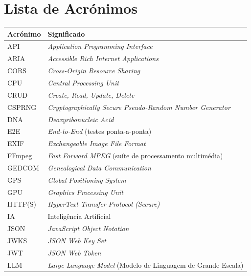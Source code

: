 \chapter*{Lista de Acrónimos}

\begin{longtable}{@{}p{2.6cm}p{12cm}@{}}
\textbf{Acrónimo} & \textbf{Significado} \\
\midrule
\endhead
API    & \textit{Application Programming Interface} \\
ARIA   & \textit{Accessible Rich Internet Applications} \\
CORS   & \textit{Cross-Origin Resource Sharing} \\
CPU    & \textit{Central Processing Unit} \\
CRUD   & \textit{Create, Read, Update, Delete} \\
CSPRNG & \textit{Cryptographically Secure Pseudo-Random Number Generator} \\
DNA    & \textit{Deoxyribonucleic Acid} \\
E2E    & \textit{End-to-End} (testes ponta-a-ponta) \\
EXIF   & \textit{Exchangeable Image File Format} \\
FFmpeg & \textit{Fast Forward MPEG} (suíte de processamento multimédia) \\
GEDCOM & \textit{Genealogical Data Communication} \\
GPS    & \textit{Global Positioning System} \\
GPU    & \textit{Graphics Processing Unit} \\
HTTP(S)& \textit{HyperText Transfer Protocol (Secure)} \\
IA     & Inteligência Artificial \\
JSON   & \textit{JavaScript Object Notation} \\
JWKS   & \textit{JSON Web Key Set} \\
JWT    & \textit{JSON Web Token} \\
LLM    & \textit{Large Language Model} (Modelo de Linguagem de Grande Escala) \\

\end{longtable}

